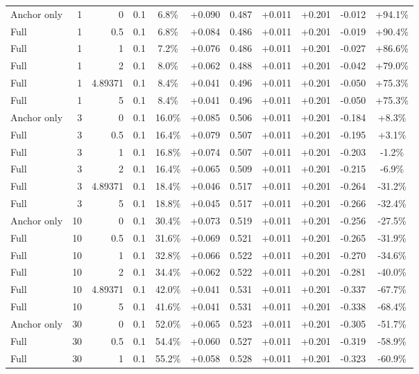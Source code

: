 \begin{table}[htbp]
\begin{tabular}{lrrrccccccc}
Anchor only & 1 & 0 & 0.1 & 6.8\% & +0.090 & 0.487 & +0.011 & +0.201 & -0.012 & +94.1\% \\
Full & 1 & 0.5 & 0.1 & 6.8\% & +0.084 & 0.486 & +0.011 & +0.201 & -0.019 & +90.4\% \\
Full & 1 & 1 & 0.1 & 7.2\% & +0.076 & 0.486 & +0.011 & +0.201 & -0.027 & +86.6\% \\
Full & 1 & 2 & 0.1 & 8.0\% & +0.062 & 0.488 & +0.011 & +0.201 & -0.042 & +79.0\% \\
Full & 1 & 4.89371 & 0.1 & 8.4\% & +0.041 & 0.496 & +0.011 & +0.201 & -0.050 & +75.3\% \\
Full & 1 & 5 & 0.1 & 8.4\% & +0.041 & 0.496 & +0.011 & +0.201 & -0.050 & +75.3\% \\
Anchor only & 3 & 0 & 0.1 & 16.0\% & +0.085 & 0.506 & +0.011 & +0.201 & -0.184 & +8.3\% \\
Full & 3 & 0.5 & 0.1 & 16.4\% & +0.079 & 0.507 & +0.011 & +0.201 & -0.195 & +3.1\% \\
Full & 3 & 1 & 0.1 & 16.8\% & +0.074 & 0.507 & +0.011 & +0.201 & -0.203 & -1.2\% \\
Full & 3 & 2 & 0.1 & 16.4\% & +0.065 & 0.509 & +0.011 & +0.201 & -0.215 & -6.9\% \\
Full & 3 & 4.89371 & 0.1 & 18.4\% & +0.046 & 0.517 & +0.011 & +0.201 & -0.264 & -31.2\% \\
Full & 3 & 5 & 0.1 & 18.8\% & +0.045 & 0.517 & +0.011 & +0.201 & -0.266 & -32.4\% \\
Anchor only & 10 & 0 & 0.1 & 30.4\% & +0.073 & 0.519 & +0.011 & +0.201 & -0.256 & -27.5\% \\
Full & 10 & 0.5 & 0.1 & 31.6\% & +0.069 & 0.521 & +0.011 & +0.201 & -0.265 & -31.9\% \\
Full & 10 & 1 & 0.1 & 32.8\% & +0.066 & 0.522 & +0.011 & +0.201 & -0.270 & -34.6\% \\
Full & 10 & 2 & 0.1 & 34.4\% & +0.062 & 0.522 & +0.011 & +0.201 & -0.281 & -40.0\% \\
Full & 10 & 4.89371 & 0.1 & 42.0\% & +0.041 & 0.531 & +0.011 & +0.201 & -0.337 & -67.7\% \\
Full & 10 & 5 & 0.1 & 41.6\% & +0.041 & 0.531 & +0.011 & +0.201 & -0.338 & -68.4\% \\
Anchor only & 30 & 0 & 0.1 & 52.0\% & +0.065 & 0.523 & +0.011 & +0.201 & -0.305 & -51.7\% \\
Full & 30 & 0.5 & 0.1 & 54.4\% & +0.060 & 0.527 & +0.011 & +0.201 & -0.319 & -58.9\% \\
Full & 30 & 1 & 0.1 & 55.2\% & +0.058 & 0.528 & +0.011 & +0.201 & -0.323 & -60.9\% \\

\end{tabular}
\end{table}
